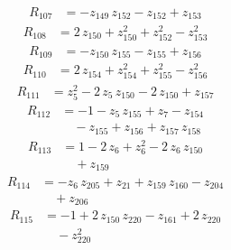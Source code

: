 \begin{equation*}\begin{aligned}
R_{107}&=-z_{149}\,z_{152} -z_{152} +z_{153}
\end{aligned}\end{equation*}
\begin{equation*}\begin{aligned}
R_{108}&=2\,z_{150} +z_{150}^{2} +z_{152}^{2} -z_{153}^{2}
\end{aligned}\end{equation*}
\begin{equation*}\begin{aligned}
R_{109}&=-z_{150}\,z_{155} -z_{155} +z_{156}
\end{aligned}\end{equation*}
\begin{equation*}\begin{aligned}
R_{110}&=2\,z_{154} +z_{154}^{2} +z_{155}^{2} -z_{156}^{2}
\end{aligned}\end{equation*}
\begin{equation*}\begin{aligned}
R_{111}&=z_{5}^{2} -2\,z_{5}\,z_{150} -2\,z_{150} +z_{157}
\end{aligned}\end{equation*}
\begin{equation*}\begin{aligned}
R_{112}&=-1 -z_{5}\,z_{155} +z_{7} -z_{154} \\
&\quad -z_{155} +z_{156} +z_{157}\,z_{158}
\end{aligned}\end{equation*}
\begin{equation*}\begin{aligned}
R_{113}&=1 -2\,z_{6} +z_{6}^{2} -2\,z_{6}\,z_{150} \\
&\quad +z_{159}
\end{aligned}\end{equation*}
\begin{equation*}\begin{aligned}
R_{114}&=-z_{6}\,z_{205} +z_{21} +z_{159}\,z_{160} -z_{204} \\
&\quad +z_{206}
\end{aligned}\end{equation*}
\begin{equation*}\begin{aligned}
R_{115}&=-1 +2\,z_{150}\,z_{220} -z_{161} +2\,z_{220} \\
&\quad -z_{220}^{2}
\end{aligned}\end{equation*}
